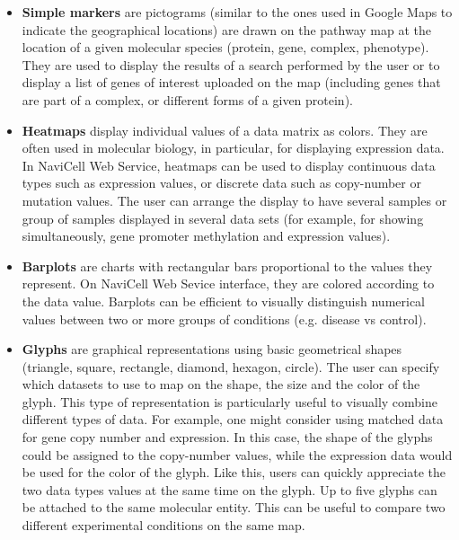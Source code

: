 \documentclass[a4,center,fleqn]{NAR}
\begin{document}
\begin{itemize}

\item \textbf{Simple markers} are pictograms (similar to the ones used in Google Maps
to indicate the geographical locations) are drawn on the pathway map at the location
of a given molecular species (protein, gene, complex, phenotype). They are used to display the
results of a search performed by the user or to display a list of genes of interest
uploaded on the map (including genes that are part of a complex, or different forms of a given protein).

\item \textbf{Heatmaps} display individual values of a data matrix as
colors. They are often used in molecular biology, in particular, for displaying expression
data. In NaviCell Web Service, heatmaps can be used to
display continuous data types such as expression values, or discrete data such
as copy-number or mutation values. The user can arrange the display to have
several samples or group of samples displayed in several data sets
(for example, for showing simultaneously, gene promoter methylation and expression values).

\item \textbf{Barplots} are charts with rectangular bars proportional to the values
they represent. On NaviCell Web Sevice interface, they are colored according to the
data value. Barplots can be efficient to visually distinguish numerical
values between two or more groups of conditions (e.g. disease vs control).

\item \textbf{Glyphs} are graphical representations using basic geometrical
shapes (triangle, square, rectangle, diamond, hexagon, circle). The user can specify
which datasets to use to map on the shape, the size and the color of the glyph. This
type of representation is particularly useful to visually combine different
types of data. For example, one might consider using matched data for
gene copy number and expression. In this case, the shape of the
glyphs could be assigned to the copy-number values, while the expression data
would be used for the color of the glyph. Like this, users can quickly
appreciate the two data types values at the same time on the glyph.
Up to five glyphs can be attached to the same molecular entity.
This can be useful to compare two different experimental conditions on the same
map.


\end{itemize}
\end{document}
